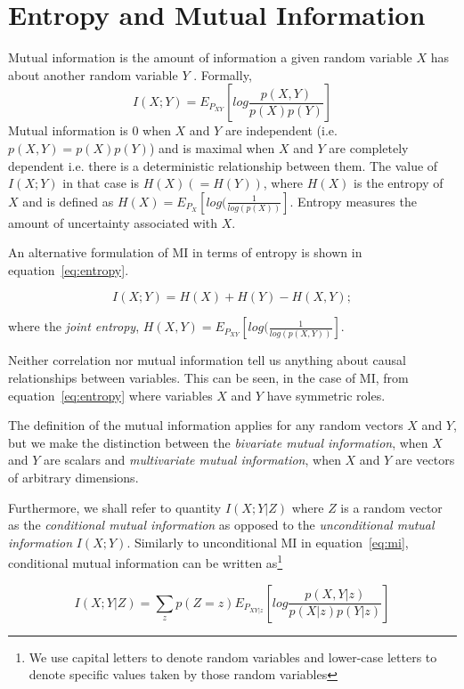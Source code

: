 \documentclass{article}
\begin{document}
\section{Entropy and Mutual Information}
\label{sec:mi}

Mutual information is the amount of information a given random
variable $X$ has about another random variable $Y$
\cite{shannon48,cover91}.  Formally,
\begin{equation}
\label{eq:mi}
I(X;Y)= E_{P_{XY}}[log \frac{p(X,Y)}{p(X)p(Y)}]
\end{equation} 
Mutual information is $0$ when $X$ and $Y$ are independent
(i.e. $p(X,Y)=p(X)p(Y)$) and is maximal when $X$ and $Y$ are
completely dependent i.e. there is a deterministic relationship
between them.  The value of $I(X;Y)$ in that case is $H(X) (=H(Y))$,
where $H(X)$ is the entropy of $X$ and is defined as $H(X) =
E_{P_X}[log(\frac{1}{log(p(X))}]$.  Entropy measures the amount of
uncertainty associated with $X$.

An alternative formulation of MI in terms of entropy is shown in
equation~\ref{eq:entropy}. 

\begin{equation}
\label{eq:entropy}
I(X;Y) = H(X) + H(Y) - H(X,Y);
\end{equation}

where the {\it joint entropy}, $H(X,Y) =
E_{P_{XY}}[log(\frac{1}{log(p(X,Y))}]$.

Neither correlation nor mutual information tell us anything about
causal relationships between variables.  This can be seen, in the case
of MI, from equation~\ref{eq:entropy} where variables $X$ and $Y$ have
symmetric roles.

The definition of the mutual information applies for any random
vectors $X$ and $Y$, but we make the distinction between the {\it
bivariate mutual information}, when $X$ and $Y$ are scalars and {\it
multivariate mutual information}, when $X$ and $Y$ are vectors of
arbitrary dimensions.

Furthermore, we shall refer to quantity $I(X;Y|Z)$ where $Z$ is a
random vector as the {\it conditional mutual information} as opposed
to the { \it unconditional mutual information} $I(X;Y)$.  Similarly to
unconditional MI in equation~\ref{eq:mi}, conditional mutual
information can be written as\footnote{We use capital letters to
denote random variables and lower-case letters to denote specific
values taken by those random variables}

\begin{equation}
\label{eq:cond-mi}
I(X;Y|Z)= \sum_z p(Z=z) E_{P_{XY|z}}[log \frac{p(X,Y|z)}{p(X|z)p(Y|z)}]
\end{equation} 
\end{document}
